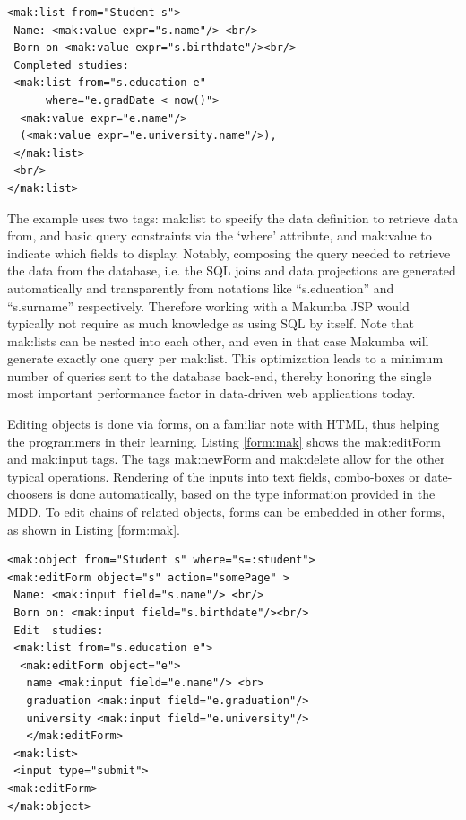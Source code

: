 \documentclass{chi2009}
\begin{document}
\lstset{basicstyle=\small, captionpos=b, caption=Example of viewing data with the Makumba JSP tag library, label=list:mak, frame=shadowbox}
\begin{lstlisting}
<mak:list from="Student s">
 Name: <mak:value expr="s.name"/> <br/>
 Born on <mak:value expr="s.birthdate"/><br/>
 Completed studies:
 <mak:list from="s.education e"
      where="e.gradDate < now()">
  <mak:value expr="e.name"/>
  (<mak:value expr="e.university.name"/>),
 </mak:list>
 <br/>
</mak:list>
\end{lstlisting}

The example uses two tags: mak:list to specify the data definition to retrieve data from, and basic query constraints via the `where' attribute, and mak:value to indicate which fields to display. Notably, composing the query needed to retrieve the data from the database, i.e. the SQL joins and data projections are generated automatically and transparently from notations like ``s.education'' and ``s.surname'' respectively. Therefore working with a Makumba JSP would typically not require as much knowledge as using SQL by itself. Note that mak:lists can be nested into each other, and even in that case Makumba will generate exactly one query per mak:list. This optimization leads to a minimum number of queries sent to the database back-end, thereby honoring the single most important performance factor in data-driven web applications today.

Editing objects is done via forms, on a familiar note with HTML, thus helping the programmers in their learning.  Listing  \ref{form:mak} shows the mak:editForm and mak:input tags. The tags mak:newForm and mak:delete allow for the other typical operations. Rendering of the inputs into text fields, combo-boxes or date-choosers is done automatically, based on the type information provided in the MDD. To edit chains of related objects, forms can be embedded in other forms, as shown in Listing \ref{form:mak}.

\lstset{basicstyle=\small, captionpos=b, caption=Example of changing data with the Makumba JSP tag library, label=form:mak, frame=shadowbox}
\begin{lstlisting}
<mak:object from="Student s" where="s=:student">
<mak:editForm object="s" action="somePage" >
 Name: <mak:input field="s.name"/> <br/>
 Born on: <mak:input field="s.birthdate"/><br/>
 Edit  studies:
 <mak:list from="s.education e"> 
  <mak:editForm object="e">
   name <mak:input field="e.name"/> <br>      
   graduation <mak:input field="e.graduation"/>
   university <mak:input field="e.university"/>
   </mak:editForm>
 <mak:list>
 <input type="submit">
<mak:editForm>
</mak:object>
\end{lstlisting}
\end{document}
